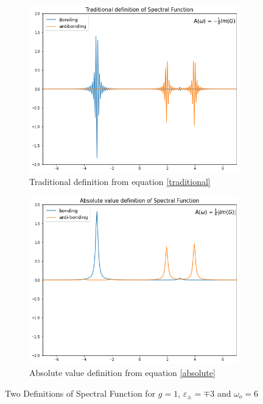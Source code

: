 \documentclass{article}
\begin{document}
\begin{figure}
\centering
\begin{subfigure}{.5\textwidth}
  \centering
  \includegraphics[width=.9\linewidth]{Traditional_defn.png}
  \caption{Traditional definition from equation \eqref{traditional}}
  \label{fig:sub1}
\end{subfigure}%
\begin{subfigure}{.5\textwidth}
  \centering
  \includegraphics[width=.9\linewidth]{Absolute_defn.png}
  \caption{Absolute value definition from equation \eqref{absolute}}
  \label{fig:sub2}
\end{subfigure}
\caption{Two Definitions of Spectral Function for $g =1$, $\varepsilon_\pm= \mp 3$ and $\omega_o = 6$}
\label{fig:test}
\end{figure}
\end{document}
